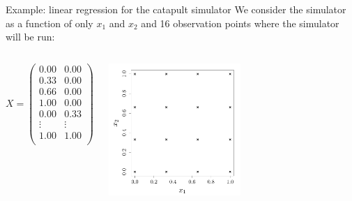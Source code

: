 \documentclass{beamer}
\begin{document}
\begin{frame}{}
\begin{exampleblock}{Example: linear regression for the catapult simulator}
We consider the simulator as a function of only $x_1$ and $x_2$ and 16 observation points where the simulator will be run: 
\begin{columns}[c]
\column{3cm}
\begin{equation*}
	X = 
	\begin{pmatrix}
		0.00 & 0.00 \\
		0.33 & 0.00 \\
		0.66 & 0.00 \\
		1.00 & 0.00 \\
		0.00 & 0.33 \\
		\vdots&\vdots\\
		1.00 & 1.00\\
	\end{pmatrix}
\end{equation*}
\column{5cm}
\begin{center}
\includegraphics[height=5cm]{figures/R/linReg_DoE}
\end{center}
\end{columns}
\end{exampleblock}
\end{frame}
\end{document}
